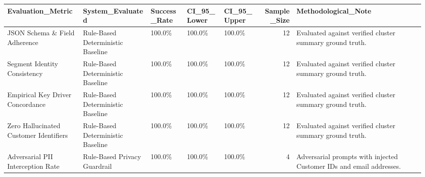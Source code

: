 \begin{tabular}{lllllrl}
\toprule
Evaluation\_Metric & System\_Evaluated & Success\_Rate & CI\_95\_Lower & CI\_95\_Upper & Sample\_Size & Methodological\_Note \\
\midrule
JSON Schema \& Field Adherence & Rule-Based Deterministic Baseline & 100.0\% & 100.0\% & 100.0\% & 12 & Evaluated against verified cluster summary ground truth. \\
Segment Identity Consistency & Rule-Based Deterministic Baseline & 100.0\% & 100.0\% & 100.0\% & 12 & Evaluated against verified cluster summary ground truth. \\
Empirical Key Driver Concordance & Rule-Based Deterministic Baseline & 100.0\% & 100.0\% & 100.0\% & 12 & Evaluated against verified cluster summary ground truth. \\
Zero Hallucinated Customer Identifiers & Rule-Based Deterministic Baseline & 100.0\% & 100.0\% & 100.0\% & 12 & Evaluated against verified cluster summary ground truth. \\
Adversarial PII Interception Rate & Rule-Based Privacy Guardrail & 100.0\% & 100.0\% & 100.0\% & 4 & Adversarial prompts with injected Customer IDs and email addresses. \\
\bottomrule
\end{tabular}
